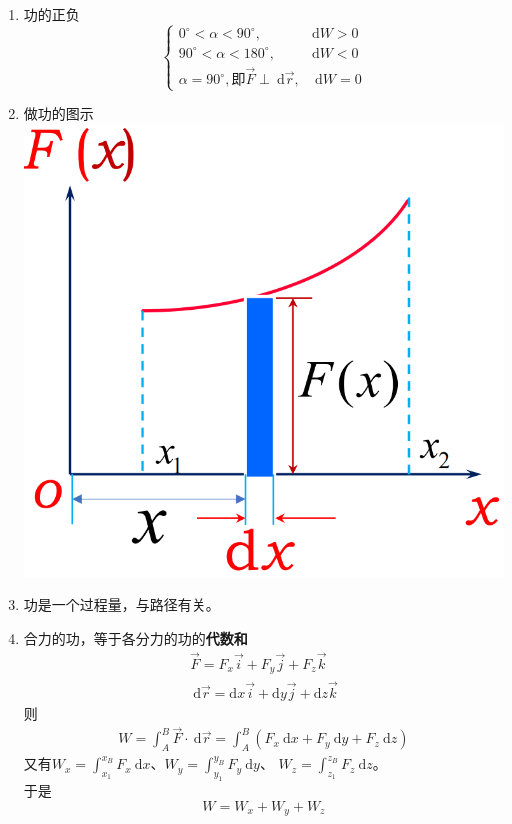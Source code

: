 \documentclass[12pt, a4paper]{article}
\numberwithin{equation}{section}
\newcommand{\rmd}{\mathrm{~d}}
\begin{document}
    \begin{enumerate}
        \item 功的正负
            $$
                \begin{cases}0^{\circ}<\alpha<90^{\circ}, & \mathrm{d} W>0 \\
                90^{\circ}<\alpha<180^{\circ}, & \mathrm{d} W<0 \\
                \alpha=90^{\circ}, \text{即} \overrightarrow{F} \perp \rmd \overrightarrow{r}, & \rmd W=0\end{cases}
            $$
        \item 做功的图示\\
            {
            \centering
            \includegraphics[scale=0.2]{"Chapter 03 images/pic2.png"}
            }
        \item 功是一个过程量，与路径有关。
        \item 合力的功，等于各分力的功的\textbf{代数和}
            \begin{align*}
                \overrightarrow{F}=F_x \overrightarrow{i}+F_y \overrightarrow{j}+F_z \overrightarrow{k} \\
                \mathrm{~d} \overrightarrow{r}=\mathrm{d} x \overrightarrow{i}+\mathrm{d} y \overrightarrow{j}+\mathrm{d} z \overrightarrow{k}
            \end{align*}
            则
            \begin{align*}
                W=\int_A^B \overrightarrow{F} \cdot \mathrm{~d} \overrightarrow{r}=
                \int_A^B\left(F_x \mathrm{~d} x+F_y \mathrm{~d} y+F_z \mathrm{~d} z\right)
            \end{align*}
            又有$W_x=\int_{x_1}^{x_B} F_x \mathrm{~d} x$、$W_y=\int_{y_1}^{y_B} F_y \mathrm{~d} y$、
            $W_z=\int_{z_1}^{z_B} F_z\mathrm{~d} z$。\\
            于是
            \[
                W = W_x + W_y + W_z
            \]

    \end{enumerate}
    
\end{document}
